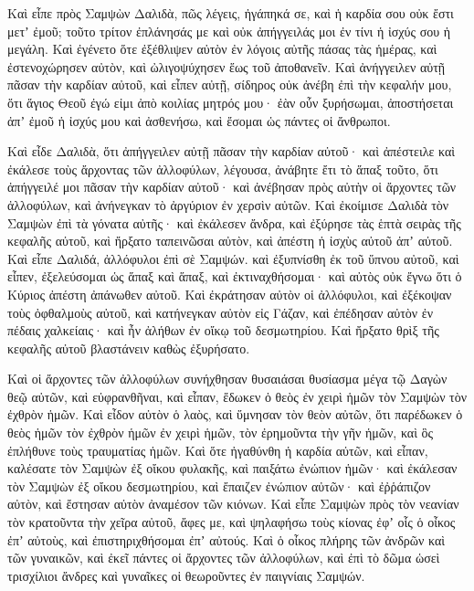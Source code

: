 {\par }{\PP {}Καὶ εἶπε πρὸς Σαμψὼν Δαλιδὰ, πῶς λέγεις, ἠγάπηκά σε, καὶ ἡ καρδία σου οὐκ ἔστι μετʼ ἐμοῦ; τοῦτο τρίτον ἐπλάνησάς με καὶ οὐκ ἀπήγγειλάς μοι ἐν τίνι ἡ ἰσχύς σου ἡ μεγάλη.
Καὶ ἐγένετο ὅτε ἐξέθλιψεν αὐτὸν ἐν λόγοις αὐτῆς πάσας τὰς ἡμέρας, καὶ ἐστενοχώρησεν αὐτὸν, καὶ ὠλιγοψύχησεν ἕως τοῦ ἀποθανεῖν.
Καὶ ἀνήγγειλεν αὐτῇ πᾶσαν τὴν καρδίαν αὐτοῦ, καὶ εἶπεν αὐτῇ, σίδηρος οὐκ ἀνέβη ἐπὶ τὴν κεφαλήν μου, ὅτι ἅγιος Θεοῦ ἐγώ εἰμι ἀπὸ κοιλίας μητρός μου· ἐὰν οὖν ξυρήσωμαι, ἀποστήσεται ἀπʼ ἐμοῦ ἡ ἰσχύς μου καὶ ἀσθενήσω, καὶ ἔσομαι ὡς πάντες οἱ ἄνθρωποι.
\par }{\PP {}Καὶ εἶδε Δαλιδὰ, ὅτι ἀπήγγειλεν αὐτῇ πᾶσαν τὴν καρδίαν αὐτοῦ· καὶ ἀπέστειλε καὶ ἐκάλεσε τοὺς ἄρχοντας τῶν ἀλλοφύλων, λέγουσα, ἀνάβητε ἔτι τὸ ἅπαξ τοῦτο, ὅτι ἀπήγγειλέ μοι πᾶσαν τὴν καρδίαν αὐτοῦ· καὶ ἀνέβησαν πρὸς αὐτὴν οἱ ἄρχοντες τῶν ἀλλοφύλων, καὶ ἀνήνεγκαν τὸ ἀργύριον ἐν χερσὶν αὐτῶν.
Καὶ ἐκοίμισε Δαλιδὰ τὸν Σαμψὼν ἐπὶ τὰ γόνατα αὐτῆς· καὶ ἐκάλεσεν ἄνδρα, καὶ ἐξύρησε τὰς ἑπτὰ σειρὰς τῆς κεφαλῆς αὐτοῦ, καὶ ἤρξατο ταπεινῶσαι αὐτὸν, καὶ ἀπέστη ἡ ἰσχὺς αὐτοῦ ἀπʼ αὐτοῦ.
Καὶ εἶπε Δαλιδά, ἀλλόφυλοι ἐπὶ σὲ Σαμψών. καὶ ἐξυπνίσθη ἐκ τοῦ ὕπνου αὐτοῦ, καὶ εἶπεν, ἐξελεύσομαι ὡς ἅπαξ καὶ ἅπαξ, καὶ ἐκτιναχθήσομαι· καὶ αὐτὸς οὐκ ἔγνω ὅτι ὁ Κύριος ἀπέστη ἀπάνωθεν αὐτοῦ.
Καὶ ἐκράτησαν αὐτὸν οἱ ἀλλόφυλοι, καὶ ἐξέκοψαν τοὺς ὀφθαλμοὺς αὐτοῦ, καὶ κατήνεγκαν αὐτὸν εἰς Γάζαν, καὶ ἐπέδησαν αὐτὸν ἐν πέδαις χαλκείαις· καὶ ἦν ἀλήθων ἐν οἴκῳ τοῦ δεσμωτηρίου.
Καὶ ἤρξατο θρὶξ τῆς κεφαλῆς αὐτοῦ βλαστάνειν καθὼς ἐξυρήσατο.
\par }{\PP {}Καὶ οἱ ἄρχοντες τῶν ἀλλοφύλων συνήχθησαν θυσαιάσαι θυσίασμα μέγα τῷ Δαγὼν θεῷ αὐτῶν, καὶ εὐφρανθῆναι, καὶ εἶπαν, ἔδωκεν ὁ θεὸς ἐν χειρὶ ἡμῶν τὸν Σαμψὼν τὸν ἐχθρὸν ἡμῶν.
Καὶ εἶδον αὐτὸν ὁ λαὸς, καὶ ὕμνησαν τὸν θεὸν αὐτῶν, ὅτι παρέδωκεν ὁ θεὸς ἡμῶν τὸν ἐχθρὸν ἡμῶν ἐν χειρὶ ἡμῶν, τὸν ἐρημοῦντα τὴν γῆν ἡμῶν, καὶ ὃς ἐπλήθυνε τοὺς τραυματίας ἡμῶν.
Καὶ ὅτε ἠγαθύνθη ἡ καρδία αὐτῶν, καὶ εἶπαν, καλέσατε τὸν Σαμψὼν ἐξ οἴκου φυλακῆς, καὶ παιξάτω ἐνώπιον ἡμῶν· καὶ ἐκάλεσαν τὸν Σαμψὼν ἐξ οἴκου δεσμωτηρίου, καὶ ἔπαιζεν ἐνώπιον αὐτῶν· καὶ ἐῤῥάπιζον αὐτὸν, καὶ ἔστησαν αὐτὸν ἀναμέσον τῶν κιόνων.
Καὶ εἶπε Σαμψὼν πρὸς τὸν νεανίαν τὸν κρατοῦντα τὴν χεῖρα αὐτοῦ, ἄφες με, καὶ ψηλαφήσω τοὺς κίονας ἐφʼ οἷς ὁ οἶκος ἐπʼ αὐτοὺς, καὶ ἐπιστηριχθήσομαι ἐπʼ αὐτούς.
Καὶ ὁ οἶκος πλήρης τῶν ἀνδρῶν καὶ τῶν γυναικῶν, καὶ ἐκεῖ πάντες οἱ ἄρχοντες τῶν ἀλλοφύλων, καὶ ἐπὶ τὸ δῶμα ὡσεὶ τρισχίλιοι ἄνδρες καὶ γυναῖκες οἱ θεωροῦντες ἐν παιγνίαις Σαμψών.
}
